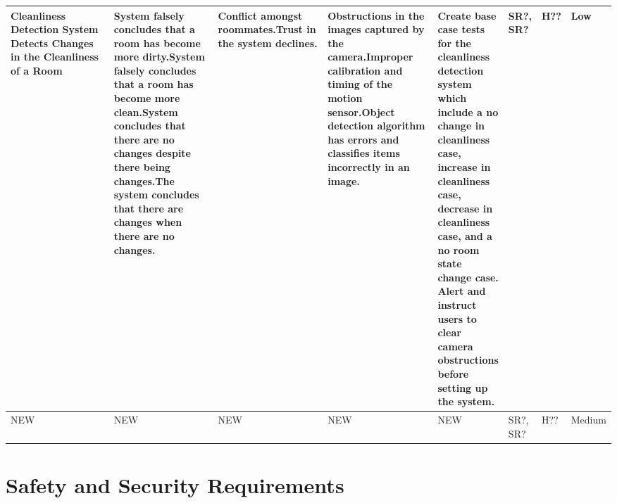 \documentclass{article}
\begin{document}
\begin{table}[H]
\begin{adjustbox}{width=\textwidth}
\begin{tabular}{|p{0.27\linewidth} | p{0.25\linewidth} | p{0.22\linewidth}|  p{0.22\linewidth}|  p{0.30\linewidth}|  p{0.07\linewidth}|  p{0.07\linewidth}|p{0.12\linewidth}| }
         \hline
         
         \hline
         Cleanliness Detection System Detects Changes in the Cleanliness of a Room & System falsely concludes that a room has become more dirty.\newline\newline System falsely concludes that a room has become more clean.\newline\newline System concludes that there are no changes despite there being changes.\newline\newline The system concludes that there are changes when there are no changes. & Conflict amongst roommates.\newline\newline Trust in the system declines. & Obstructions in the images captured by the camera.\newline\newline Improper calibration and timing of the motion sensor.\newline\newline Object detection algorithm has errors and classifies items incorrectly in an image.& Create base case tests for the cleanliness detection system which include a no change in cleanliness case, increase in cleanliness case, decrease in cleanliness case, and a no room state change case. \newline\newline Alert and instruct users to clear camera obstructions before setting up the system. & SR?, SR? & H?? & Low\\
         \hline
         
         \hline
         NEW & NEW\newline & NEW & NEW & NEW & SR?, SR? & H?? & Medium\\
         \hline
    \end{tabular}
    \end{adjustbox}
    \label{tab:my_label}
\end{table}


\newpage

\section{Safety and Security Requirements}

\end{document}
